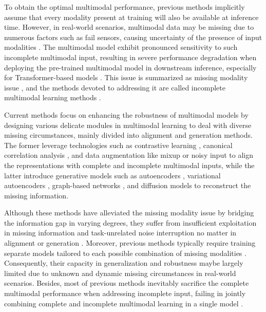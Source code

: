 \documentclass{article}
\begin{document}
To obtain the optimal multimodal performance, previous methods implicitly assume that every modality present at training will also be available at inference time. However, in real-world scenarios, multimodal data may be missing due to numerous factors such as fail sensors, causing uncertainty of the presence of input modalities \cite{wu2024deep}. The multimodal model exhibit pronounced sensitivity to such incomplete multimodal input, resulting in severe performance degradation when deploying the pre-trained multimodal model in downstream inference, especially for Transformer-based models \cite{ma2022multimodal}. This issue is summarized  as missing modality issue \cite{ma2021smil,lin2023missmodal,yuan2024noise}, and the methods devoted to addressing it are called incomplete multimodal learning methods \cite{li2024toward,lin2024adapt,zhang2024towards}.

Current methods focus on enhancing the robustness of multimodal models by designing various delicate modules in multimodal learning to deal with diverse missing circumstances, mainly divided into alignment and generation methods. The former leverage technologies such as contrastive learning \cite{poklukar2022geometric,lin2023missmodal,liu2024cifmmin}, canonical correlation analysis \cite{hotelling1992cca,andrew2013dcca,wang2015dccae}, and data augmentation like mixup or noisy input \cite{hazarika2022analyzing,lin2024adapt,yuan2024noise} to align the representations with complete and incomplete multimodal inputs, while the latter introduce generative models such as autoencoders \cite{bengio2006greedy,pham2019found,zhao2021missing}, variational autoencoders \cite{wu2018mvae,shi2019mmvae,vasco2022leveraging,vasco2022muse}, graph-based networks \cite{lian2023gcnet,shou2024adversarial}, and diffusion models \cite{wang2023incomplete} to reconstruct the missing information.

Although these methods have alleviated the missing modality issue by bridging the information gap in varying degrees, they suffer from insufficient exploitation in missing information and task-unrelated noise interruption no matter in alignment or generation \cite{wang2023incomplete,li2024toward}. Moreover, previous methods typically require training separate models tailored to each possible combination of missing modalities \cite{pham2019found,lian2023gcnet}. Consequently, their capacity in generalization and robustness maybe largely limited due to unknown and dynamic missing circumstances in real-world scenarios. Besides, most of previous methods inevitably sacrifice the complete multimodal performance when addressing incomplete input, failing in jointly combining complete and incomplete multimodal learning in a single model \cite{lin2024adapt}.
\end{document}
